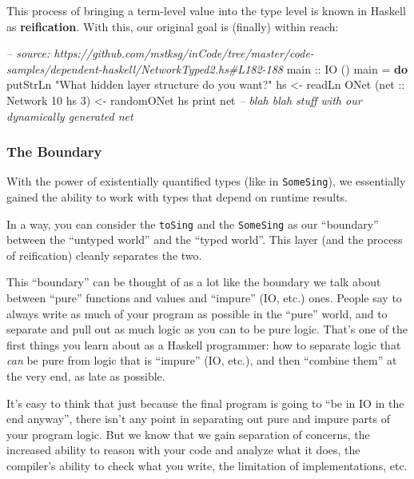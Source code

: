 \documentclass[]{article}
\newenvironment{Shaded}{}{}
\newcommand{\KeywordTok}[1]{\textcolor[rgb]{0.00,0.44,0.13}{\textbf{{#1}}}}
\newcommand{\DataTypeTok}[1]{\textcolor[rgb]{0.56,0.13,0.00}{{#1}}}
\newcommand{\DecValTok}[1]{\textcolor[rgb]{0.25,0.63,0.44}{{#1}}}
\newcommand{\StringTok}[1]{\textcolor[rgb]{0.25,0.44,0.63}{{#1}}}
\newcommand{\CommentTok}[1]{\textcolor[rgb]{0.38,0.63,0.69}{\textit{{#1}}}}
\newcommand{\OtherTok}[1]{\textcolor[rgb]{0.00,0.44,0.13}{{#1}}}
\newcommand{\FunctionTok}[1]{\textcolor[rgb]{0.02,0.16,0.49}{{#1}}}
\newcommand{\NormalTok}[1]{{#1}}
\begin{document}
This process of bringing a term-level value into the type level is known in
Haskell as \textbf{reification}. With this, our original goal is (finally)
within reach:

\begin{Shaded}
\begin{Highlighting}[]
\CommentTok{-- source: https://github.com/mstksg/inCode/tree/master/code-samples/dependent-haskell/NetworkTyped2.hs#L182-188}
\OtherTok{main ::} \DataTypeTok{IO} \NormalTok{()}
\NormalTok{main }\FunctionTok{=} \KeywordTok{do}
    \NormalTok{putStrLn }\StringTok{"What hidden layer structure do you want?"}
    \NormalTok{hs }\OtherTok{<-} \NormalTok{readLn}
    \DataTypeTok{ONet} \NormalTok{(}\OtherTok{net ::} \DataTypeTok{Network} \DecValTok{10} \NormalTok{hs }\DecValTok{3}\NormalTok{) }\OtherTok{<-} \NormalTok{randomONet hs}
    \NormalTok{print net}
    \CommentTok{-- blah blah stuff with our dynamically generated net}
\end{Highlighting}
\end{Shaded}

\subsubsection{The Boundary}\label{the-boundary}

With the power of existentially quantified types (like in \texttt{SomeSing}), we
essentially gained the ability to work with types that depend on runtime
results.

In a way, you can consider the \texttt{toSing} and the \texttt{SomeSing} as our
``boundary'' between the ``untyped world'' and the ``typed world''. This layer
(and the process of reification) cleanly separates the two.

This ``boundary'' can be thought of as a lot like the boundary we talk about
between ``pure'' functions and values and ``impure'' (IO, etc.) ones. People say
to always write as much of your program as possible in the ``pure'' world, and
to separate and pull out as much logic as you can to be pure logic. That's one
of the first things you learn about as a Haskell programmer: how to separate
logic that \emph{can} be pure from logic that is ``impure'' (IO, etc.), and then
``combine them'' at the very end, as late as possible.

It's easy to think that just because the final program is going to ``be in IO in
the end anyway'', there isn't any point in separating out pure and impure parts
of your program logic. But we know that we gain separation of concerns, the
increased ability to reason with your code and analyze what it does, the
compiler's ability to check what you write, the limitation of implementations,
etc.
\end{document}
